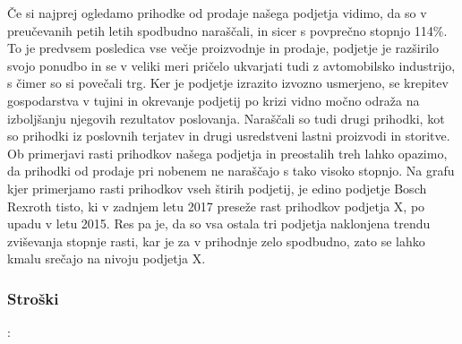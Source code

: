 \documentclass[12pt,a4paper]{amsart}
\theoremstyle{definition} %
\theoremstyle{plain} %
\begin{document}
Če si najprej ogledamo prihodke od prodaje našega podjetja vidimo, da so v preučevanih petih letih spodbudno naraščali, in sicer s povprečno stopnjo 114\%. To je predvsem posledica vse večje proizvodnje in prodaje, podjetje je razširilo svojo ponudbo in se v veliki meri pričelo ukvarjati tudi z avtomobilsko industrijo, s čimer so si povečali trg. Ker je podjetje izrazito izvozno usmerjeno, se krepitev gospodarstva v tujini in okrevanje podjetij po krizi vidno močno odraža na izboljšanju njegovih rezultatov poslovanja. Naraščali so tudi drugi prihodki, kot so prihodki iz poslovnih terjatev in drugi usredstveni lastni proizvodi in storitve. Ob primerjavi rasti prihodkov našega podjetja in preostalih treh lahko opazimo, da prihodki od prodaje pri nobenem ne naraščajo s tako visoko stopnjo. 
Na grafu kjer primerjamo rasti prihodkov vseh štirih podjetij, je edino podjetje Bosch Rexroth tisto, ki v zadnjem letu 2017 preseže rast prihodkov podjetja X, po upadu v letu 2015. Res pa je, da so vsa ostala tri podjetja naklonjena trendu zviševanja stopnje rasti, kar je za v prihodnje zelo spodbudno, zato se lahko kmalu srečajo na nivoju podjetja X.\\

\subsubsection{Stroški}:\\
\end{document}
